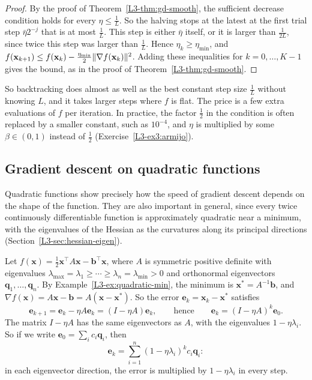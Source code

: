 \begin{proof}
    By the proof of Theorem~\ref{L3-thm:gd-smooth}, the sufficient decrease condition holds for every $\eta \leq \frac{1}{L}$. So the halving stops at the latest at the first trial step $\bar\eta2^{-j}$ that is at most $\frac{1}{L}$. This step is either $\bar\eta$ itself, or it is larger than $\frac{1}{2L}$, since twice this step was larger than $\frac{1}{L}$. Hence $\eta_k \geq \eta_{\min}$, and $f(\mathbf{x}_{k+1}) \leq f(\mathbf{x}_k) - \frac{\eta_{\min}}{2}\lVert \nabla f(\mathbf{x}_k) \rVert^2$. Adding these inequalities for $k = 0, \ldots, K - 1$ gives the bound, as in the proof of Theorem~\ref{L3-thm:gd-smooth}.
\end{proof}

So backtracking does almost as well as the best constant step size $\frac{1}{L}$ without knowing $L$, and it takes larger steps where $f$ is flat. The price is a few extra evaluations of $f$ per iteration. In practice, the factor $\frac{1}{2}$ in the condition is often replaced by a smaller constant, such as $10^{-4}$, and $\eta$ is multiplied by some $\beta \in (0, 1)$ instead of $\frac{1}{2}$ (Exercise~\ref{L3-ex3:armijo}).

\subsection{Gradient descent on quadratic functions}

Quadratic functions show precisely how the speed of gradient descent depends on the shape of the function. They are also important in general, since every twice continuously differentiable function is approximately quadratic near a minimum, with the eigenvalues of the Hessian as the curvatures along its principal directions (Section~\ref{L3-sec:hessian-eigen}).

Let $f(\mathbf{x}) = \frac{1}{2}\mathbf{x}^\top A\mathbf{x} - \mathbf{b}^\top\mathbf{x}$, where $A$ is symmetric positive definite with eigenvalues $\lambda_{\max} = \lambda_1 \geq \cdots \geq \lambda_n = \lambda_{\min} > 0$ and orthonormal eigenvectors $\mathbf{q}_1, \ldots, \mathbf{q}_n$. By Example~\ref{L3-ex:quadratic-min}, the minimum is $\mathbf{x}^* = A^{-1}\mathbf{b}$, and $\nabla f(\mathbf{x}) = A\mathbf{x} - \mathbf{b} = A(\mathbf{x} - \mathbf{x}^*)$. So the error $\mathbf{e}_k = \mathbf{x}_k - \mathbf{x}^*$ satisfies
\[\mathbf{e}_{k+1} = \mathbf{e}_k - \eta A\mathbf{e}_k = (I - \eta A)\mathbf{e}_k, \qquad \text{hence} \qquad \mathbf{e}_k = (I - \eta A)^k \mathbf{e}_0.\]
The matrix $I - \eta A$ has the same eigenvectors as $A$, with the eigenvalues $1 - \eta\lambda_i$. So if we write $\mathbf{e}_0 = \sum_i c_i\mathbf{q}_i$, then
\[\mathbf{e}_k = \sum_{i=1}^n (1 - \eta\lambda_i)^k c_i \mathbf{q}_i:\]
in each eigenvector direction, the error is multiplied by $1 - \eta\lambda_i$ in every step.

